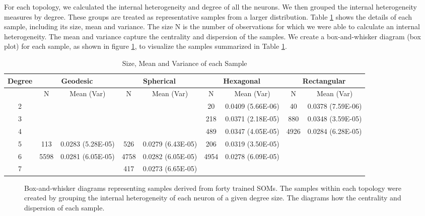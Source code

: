 For each topology, we calculated the internal heterogeneity and degree of
all the neurons.  We then grouped the internal heterogeneity measures by degree.  These groups are
treated as representative samples from a larger distribution. Table \ref{meanvar1}
shows the details of each sample, including its size, mean and variance. 
The size N is the number of observations for which we were able to calculate an
internal heterogeneity. The mean and variance capture the centrality and
dispersion of the samples.  We create a box-and-whisker diagram (box plot) for
each sample, as shown in figure \ref{boxplot}, to visualize the samples
summarized in Table \ref{meanvar1}.

\begin{table}[htb]
\scriptsize
\begin{minipage}{\textwidth}
\caption{Size, Mean and Variance of each Sample}
\label{meanvar1}
\begin{tabular}{|c||cc|cc|cc|cc|}
\hline
\textbf{Degree} & \multicolumn{2}{c|}{\textbf{Geodesic}} &
\multicolumn{2}{c|}{\textbf{Spherical}} &
\multicolumn{2}{c|}{\textbf{Hexagonal}} &
\multicolumn{2}{c|}{\textbf{Rectangular}} \\
\hline
& N & Mean (Var) & N & Mean (Var) & N & Mean (Var) & N & Mean (Var) \\
\hline
2&&&&& 20& 0.0409 (5.66E-06)& 40& 0.0378 (7.59E-06)\\ 
3&&&&& 218& 0.0371 (2.18E-05)& 880& 0.0348 (3.59E-05)\\ 
4&&&&& 489& 0.0347 (4.05E-05)& 4926& 0.0284 (6.28E-05)\\ 
5& 113& 0.0283 (5.28E-05)& 526& 0.0279 (6.43E-05)& 206& 0.0319 (3.50E-05)&&\\ 
6& 5598& 0.0281 (6.05E-05)& 4758& 0.0282 (6.05E-05)& 4954& 0.0278
(6.09E-05)&&\\ 
7&&& 417& 0.0273 (6.65E-05)&&&&\\ 
\hline
\end{tabular} \end{minipage} \end{table}

\begin{figure}[htb]
\centering
{}
\begin{minipage}{5.3in}
\caption{Box-and-whisker diagrams representing samples derived from forty
trained SOMs.  The samples within each topology were created by grouping the
internal heterogeneity of each neuron of a given degree size. The diagrams how the
centrality and dispersion of each sample.}
\label{boxplot}
\end{minipage}
\end{figure}


